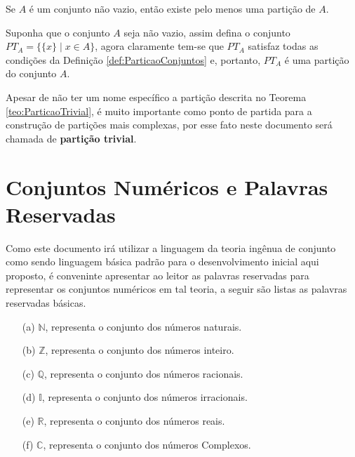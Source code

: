 \begin{teorema}\label{teo:ParticaoTrivial}
	Se $A$ é um conjunto não vazio, então existe pelo menos uma partição de $A$.
\end{teorema}

\begin{prova}
	Suponha que o conjunto $A$ seja não vazio, assim defina o conjunto $PT_A = \{\{x\} \mid x \in A\}$, agora claramente tem-se que $PT_A$ satisfaz todas as condições da Definição \ref{def:ParticaoConjuntos} e, portanto, $PT_A$ é uma partição do conjunto $A$.
\end{prova}

\begin{atencao}
  Apesar de não ter um nome específico a partição descrita no Teorema \ref{teo:ParticaoTrivial}, é muito importante como ponto de partida para a construção de partições mais complexas, por esse fato neste documento será chamada de \textbf{partição trivial}.
\end{atencao}

\section{Conjuntos Numéricos e Palavras Reservadas}\label{sec:ConjuntoNumericoPalavrasReservadas}

Como este documento irá  utilizar a linguagem da teoria ingênua de conjunto como sendo linguagem básica padrão para o desenvolvimento inicial aqui proposto, é conveninte apresentar ao leitor as palavras reservadas para representar os conjuntos numéricos em tal teoria, a seguir são listas as palavras reservadas básicas.

\begin{itemize}
  \item[(a)] $\mathbb{N}$, representa o conjunto dos números naturais.
  \item[(b)] $\mathbb{Z}$, representa o conjunto dos números inteiro.
  \item[(c)] $\mathbb{Q}$, representa o conjunto dos números racionais.
  \item[(d)] $\mathbb{I}$, representa o conjunto dos números irracionais.
  \item[(e)] $\mathbb{R}$, representa o conjunto dos números reais.
  \item[(f)] $\mathbb{C}$, representa o conjunto dos números Complexos.
\end{itemize}

